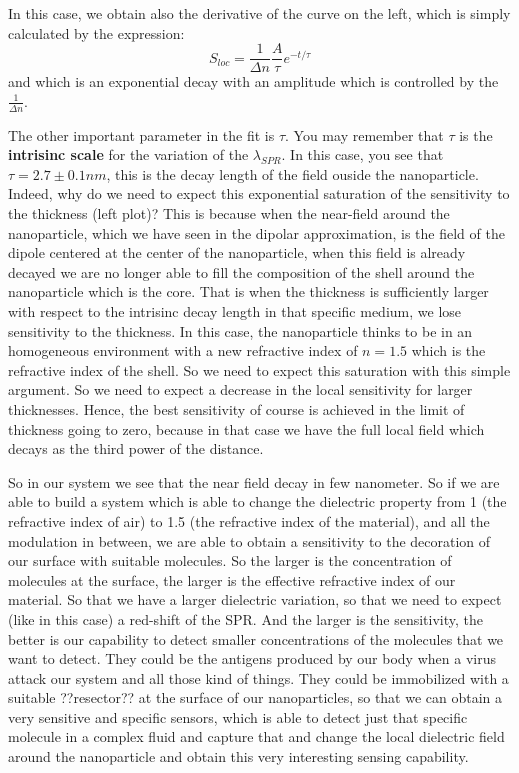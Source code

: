 \documentclass[../main/main.tex]{subfiles}
\begin{document}
In this case, we obtain also the derivative of the curve on the left, which is simply calculated by the expression:
\begin{equation*}
  S_{loc} = \frac{1}{\Delta n} \frac{A}{\tau } e^{-t/\tau }
\end{equation*}
and which is an exponential decay with an amplitude which is controlled by the \( \frac{1}{\Delta n} \).

The other important parameter in the fit is \( \tau  \). You may remember that \( \tau  \) is the \textbf{intrisinc scale} for the variation of the \( \lambda _{SPR} \). In this case, you see that \( \tau = 2.7 \pm 0.1 nm\), this is the decay length of the field ouside the nanoparticle. Indeed, why do we need to expect this exponential saturation of the sensitivity to the thickness (left plot)?
This is because when the near-field around the nanoparticle, which we have seen in the dipolar approximation, is the field of the dipole centered at the center of the nanoparticle, when this field is already decayed we are no longer able to fill the composition of the shell around the nanoparticle which is the core. That is when the thickness is sufficiently larger with respect to the intrisinc decay length in that specific medium, we lose sensitivity to the thickness. In this case, the nanoparticle thinks to be in an homogeneous environment with a new refractive index of \( n=1.5 \) which is the refractive index of the shell. So we need to expect this saturation with this simple argument. So we need to expect a decrease in the local sensitivity for larger thicknesses. Hence, the best sensitivity of course is achieved in the limit of thickness going to zero, because in that case we have the full local field which decays as the third power of the distance.

So in our system we see that the near field decay in few nanometer.
So if we are able to build a system which is able to change the dielectric property from 1 (the refractive index of air) to 1.5 (the refractive index of the material), and all the modulation in between, we are able to obtain a sensitivity to the decoration of our surface with suitable molecules.
So the larger is the concentration of molecules at the surface, the larger is the effective refractive index of our material. So that we have a larger dielectric variation, so that we need to expect (like in this case) a red-shift of the SPR. And the larger is the sensitivity, the better is our capability to detect smaller concentrations of the molecules that we want to detect. They could be the antigens produced by our body when a virus attack our system and all those kind of things. They could be immobilized with a suitable ??resector?? at the surface of our nanoparticles, so that we can obtain a very sensitive and specific sensors, which is able to detect just that specific molecule in a complex fluid and capture that and change the local dielectric field around the nanoparticle and obtain this very interesting sensing capability.
\end{document}
